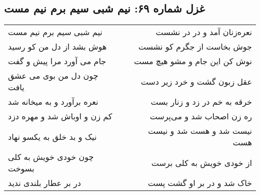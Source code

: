 \begin{center}
\section*{غزل شماره ۶۹: نیم شبی سیم برم نیم مست}
\label{sec:069}
\begin{longtable}{l p{0.5cm} r}
نیم شبی سیم برم نیم مست
&&
نعره‌زنان آمد و در در نشست
\\
هوش بشد از دل من کو رسید
&&
جوش بخاست از جگرم کو نشست
\\
جام می آورد مرا پیش و گفت
&&
نوش کن این جام و مشو هیچ مست
\\
چون دل من بوی می عشق یافت
&&
عقل زبون گشت و خرد زیر دست
\\
نعره برآورد و به میخانه شد
&&
خرقه به خم در زد و زنار بست
\\
کم زن و اوباش شد و مهره دزد
&&
ره زن اصحاب شد و می‌پرست
\\
نیک و بد خلق به یکسو نهاد
&&
نیست شد و هست شد و نیست هست
\\
چون خودی خویش به کلی بسوخت
&&
از خودی خویش به کلی برست
\\
در بر عطار بلندی ندید
&&
خاک شد و در بر او گشت پست
\\
\end{longtable}
\end{center}
